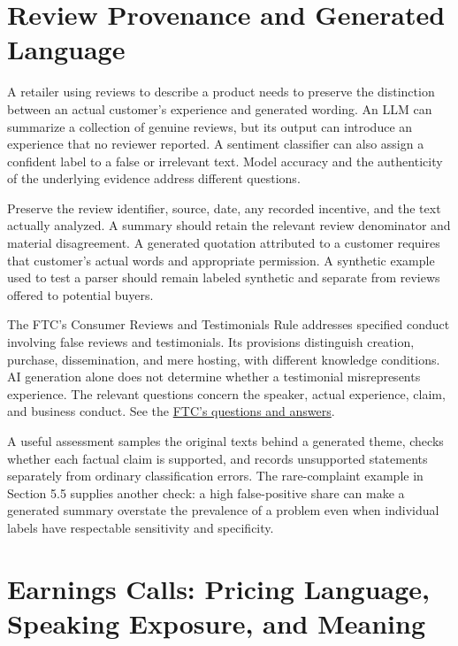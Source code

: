 \hypertarget{M05-review-provenance-and-generated-language}{%
\section{Review Provenance and Generated
Language}\label{M05-review-provenance-and-generated-language}}

\noindent \noindent A retailer using reviews to describe a product needs to
preserve the distinction between an actual customer's experience and
generated wording. An LLM can summarize a collection of genuine reviews,
but its output can introduce an experience that no reviewer reported. A
sentiment classifier can also assign a confident label to a false or
irrelevant text. Model accuracy and the authenticity of the underlying
evidence address different questions.

Preserve the review identifier, source, date, any recorded incentive,
and the text actually analyzed. A summary should retain the relevant
review denominator and material disagreement. A generated quotation
attributed to a customer requires that customer's actual words and
appropriate permission. A synthetic example used to test a parser should
remain labeled synthetic and separate from reviews offered to potential
buyers.

The FTC's Consumer Reviews and Testimonials Rule addresses specified
conduct involving false reviews and testimonials. Its provisions
distinguish creation, purchase, dissemination, and mere hosting, with
different knowledge conditions. AI generation alone does not determine
whether a testimonial misrepresents experience. The relevant questions
concern the speaker, actual experience, claim, and business conduct. See
the
\href{https://www.ftc.gov/business-guidance/resources/consumer-reviews-testimonials-rule-questions-answers}{FTC's
questions and answers}.

A useful assessment samples the original texts behind a generated theme,
checks whether each factual claim is supported, and records unsupported
statements separately from ordinary classification errors. The
rare-complaint example in Section 5.5 supplies another check: a high
false-positive share can make a generated summary overstate the
prevalence of a problem even when individual labels have respectable
sensitivity and specificity.

\hypertarget{M05-earnings-calls-pricing-language-speaking-exposure-and-meaning}{%
\section{Earnings Calls: Pricing Language, Speaking Exposure, and
Meaning}\label{M05-earnings-calls-pricing-language-speaking-exposure-and-meaning}}

